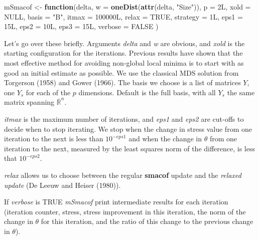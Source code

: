 \documentclass[
  12pt,
]{article}
\newenvironment{Shaded}{\begin{snugshade}}{\end{snugshade}}
\newcommand{\AttributeTok}[1]{\textcolor[rgb]{0.13,0.29,0.53}{#1}}
\newcommand{\ConstantTok}[1]{\textcolor[rgb]{0.56,0.35,0.01}{#1}}
\newcommand{\ControlFlowTok}[1]{\textcolor[rgb]{0.13,0.29,0.53}{\textbf{#1}}}
\newcommand{\DataTypeTok}[1]{\textcolor[rgb]{0.13,0.29,0.53}{#1}}
\newcommand{\DecValTok}[1]{\textcolor[rgb]{0.00,0.00,0.81}{#1}}
\newcommand{\FunctionTok}[1]{\textcolor[rgb]{0.13,0.29,0.53}{\textbf{#1}}}
\newcommand{\NormalTok}[1]{#1}
\newcommand{\OtherTok}[1]{\textcolor[rgb]{0.56,0.35,0.01}{#1}}
\newcommand{\StringTok}[1]{\textcolor[rgb]{0.31,0.60,0.02}{#1}}
\begin{document}
\begin{Shaded}
\begin{Highlighting}[]
\NormalTok{mSmacof }\OtherTok{\textless{}{-}} \ControlFlowTok{function}\NormalTok{(delta,}
                    \AttributeTok{w =} \FunctionTok{oneDist}\NormalTok{(}\FunctionTok{attr}\NormalTok{(delta, }\StringTok{"Size"}\NormalTok{)),}
                    \AttributeTok{p =} \DecValTok{2}\DataTypeTok{L}\NormalTok{,}
                    \AttributeTok{xold =} \ConstantTok{NULL}\NormalTok{,}
                    \AttributeTok{basis =} \StringTok{"B"}\NormalTok{,}
                    \AttributeTok{itmax =} \DecValTok{100000}\DataTypeTok{L}\NormalTok{,}
                    \AttributeTok{relax =} \ConstantTok{TRUE}\NormalTok{,}
                    \AttributeTok{strategy =} \DecValTok{1}\DataTypeTok{L}\NormalTok{,}
                    \AttributeTok{eps1 =} \DecValTok{15}\DataTypeTok{L}\NormalTok{,}
                    \AttributeTok{eps2 =} \DecValTok{10}\DataTypeTok{L}\NormalTok{,}
                    \AttributeTok{eps3 =} \DecValTok{15}\DataTypeTok{L}\NormalTok{,}
                    \AttributeTok{verbose =} \ConstantTok{FALSE}
\NormalTok{)}
\end{Highlighting}
\end{Shaded}

Let's go over these briefly. Arguments \emph{delta} and \emph{w} are obvious, and \emph{xold}
is the starting configuration for the iterations. Previous results have shown
that the most effective method for avoiding non-global local minima is to start
with as good an initial estimate as possible. We use the classical MDS solution
from Torgerson (1958) and Gower (1966). The basis we choose is a list of matrices
\(Y\), one \(Y_s\) for each of the \(p\) dimensions. Default is the full basis, with all \(Y_s\) the same matrix spanning \(\overline{\mathbb{R}}^n\).

\emph{itmax} is the maximum number of iterations, and \emph{eps1} and \emph{eps2} are
cut-offs to decide when to stop iterating. We stop when the
change in stress value from one iteration to the next is less than
\(10^{-eps1}\) and when the change in \(\theta\) from one iteration to the next,
measured by the least squares norm of the difference, is less that \(10^{-eps2}\).

\emph{relax} allows us to choose between the regular \textbf{smacof} update and the
\emph{relaxed update} (De Leeuw and Heiser (1980)).

If \emph{verbose} is TRUE \emph{mSmacof} print intermediate results for each iteration
(iteration counter, stress, stress improvement in this iteration, the norm of the change in \(\theta\) for this iteration, and the ratio of this change to the previous change in \(\theta\)).
\end{document}
